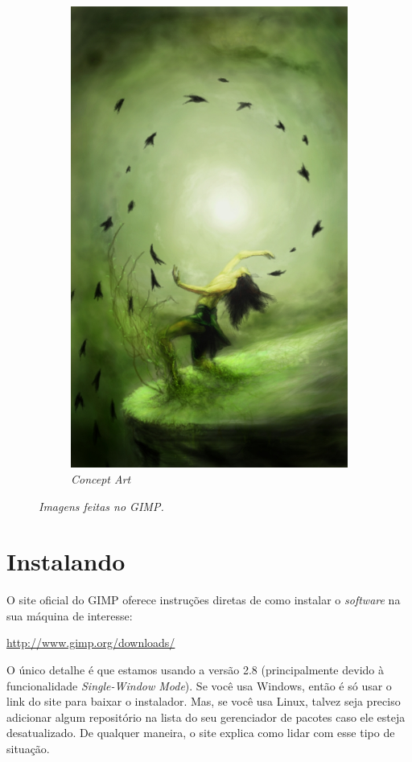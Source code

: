 \documentclass[12pt,onecolumn]{article}
\begin{document}
\begin{figure}[ht]
\begin{subfigure}{.5\textwidth}
      \includegraphics[width=.7\linewidth]{screenshots/Dance_of_Rebirth_by_shiroikuro.jpg}
      \caption{
        \footnotesize
        \it
        Concept Art
      }
      \label{fig:conceptart}
    \end{subfigure}
    \caption{
      \footnotesize
      \it
      Imagens feitas no GIMP.
    }
  \end{figure}

\clearpage
\section{Instalando}
  O site oficial do GIMP oferece instruções diretas de como instalar o {\it
  software} na sua máquina de interesse:
  
  \begin{center}
    \url{http://www.gimp.org/downloads/}
  \end{center}
  
  O único detalhe é que estamos usando a versão 2.8 (principalmente devido à
  funcionalidade {\it Single-Window Mode}). Se você usa Windows, então é só
  usar o link do site para baixar o instalador. Mas, se você usa Linux, talvez
  seja preciso adicionar algum repositório na lista do seu gerenciador de 
  pacotes caso ele esteja desatualizado. De qualquer maneira, o site explica
  como lidar com esse tipo de situação.
\end{document}

